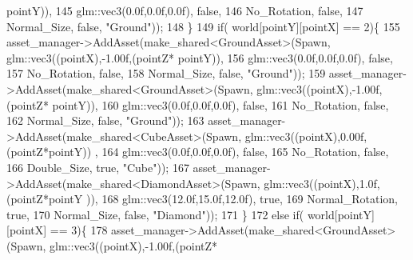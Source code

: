 \begin{DoxyCode}
      pointY)),
145                                                              glm::vec3(0.0f,0.0f,0.0f), \textcolor{keyword}{false},
146                                                              No\_Rotation, \textcolor{keyword}{false},
147                                                              Normal\_Size, \textcolor{keyword}{false}, \textcolor{stringliteral}{"Ground"}));
148    \}
149    \textcolor{keywordflow}{if}( world[pointY][pointX] == 2)\{
155             asset\_manager->AddAsset(make\_shared<GroundAsset>(Spawn, glm::vec3((pointX),-1.00f,(pointZ*
      pointY)),
156                                                              glm::vec3(0.0f,0.0f,0.0f), \textcolor{keyword}{false},
157                                                              No\_Rotation, \textcolor{keyword}{false},
158                                                              Normal\_Size, \textcolor{keyword}{false}, \textcolor{stringliteral}{"Ground"}));
159             asset\_manager->AddAsset(make\_shared<GroundAsset>(Spawn, glm::vec3((pointX),-1.00f,(pointZ*
      pointY)),
160                                                              glm::vec3(0.0f,0.0f,0.0f), \textcolor{keyword}{false},
161                                                              No\_Rotation, \textcolor{keyword}{false},
162                                                              Normal\_Size, \textcolor{keyword}{false}, \textcolor{stringliteral}{"Ground"}));
163             asset\_manager->AddAsset(make\_shared<CubeAsset>(Spawn, glm::vec3((pointX),0.00f,(pointZ*pointY))
      , 
164                                                            glm::vec3(0.0f,0.0f,0.0f), \textcolor{keyword}{false},
165                                                            No\_Rotation, \textcolor{keyword}{false},
166                                                            Double\_Size, \textcolor{keyword}{true}, \textcolor{stringliteral}{"Cube"}));
167             asset\_manager->AddAsset(make\_shared<DiamondAsset>(Spawn, glm::vec3((pointX),1.0f,(pointZ*pointY
      )), 
168                                                               glm::vec3(12.0f,15.0f,12.0f), \textcolor{keyword}{true},
169                                                               Normal\_Rotation, \textcolor{keyword}{true},
170                                                               Normal\_Size, \textcolor{keyword}{false}, \textcolor{stringliteral}{"Diamond"}));
171    \}
172    \textcolor{keywordflow}{else} \textcolor{keywordflow}{if}( world[pointY][pointX] == 3)\{
178             asset\_manager->AddAsset(make\_shared<GroundAsset>(Spawn, glm::vec3((pointX),-1.00f,(pointZ*

\end{DoxyCode}
